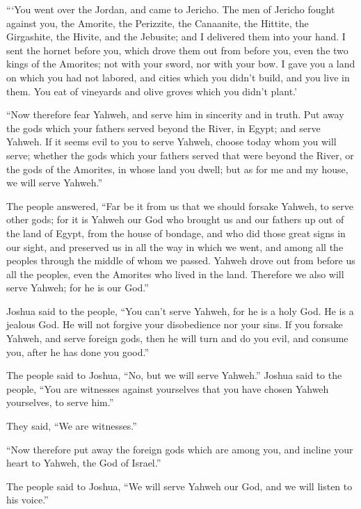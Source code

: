  ```You went over the Jordan, and came to Jericho. The men
of Jericho fought against you, the Amorite, the Perizzite, the
Canaanite, the Hittite, the Girgashite, the Hivite, and the Jebusite;
and I delivered them into your hand.  I sent the hornet
before you, which drove them out from before you, even the two kings of
the Amorites; not with your sword, nor with your bow.  I
gave you a land on which you had not labored, and cities which you
didn't build, and you live in them. You eat of vineyards and olive
groves which you didn't plant.'

 ``Now therefore fear Yahweh, and serve him in sincerity
and in truth. Put away the gods which your fathers served beyond the
River, in Egypt; and serve Yahweh.  If it seems evil to you
to serve Yahweh, choose today whom you will serve; whether the gods
which your fathers served that were beyond the River, or the gods of the
Amorites, in whose land you dwell; but as for me and my house, we will
serve Yahweh.''

 The people answered, ``Far be it from us that we should
forsake Yahweh, to serve other gods;  for it is Yahweh our
God who brought us and our fathers up out of the land of Egypt, from the
house of bondage, and who did those great signs in our sight, and
preserved us in all the way in which we went, and among all the peoples
through the middle of whom we passed.  Yahweh drove out
from before us all the peoples, even the Amorites who lived in the land.
Therefore we also will serve Yahweh; for he is our God.''

 Joshua said to the people, ``You can't serve Yahweh, for
he is a holy God. He is a jealous God. He will not forgive your
disobedience nor your sins.  If you forsake Yahweh, and
serve foreign gods, then he will turn and do you evil, and consume you,
after he has done you good.''

 The people said to Joshua, ``No, but we will serve
Yahweh.''  Joshua said to the people, ``You are witnesses
against yourselves that you have chosen Yahweh yourselves, to serve
him.''

They said, ``We are witnesses.''

 ``Now therefore put away the foreign gods which are among
you, and incline your heart to Yahweh, the God of Israel.''

 The people said to Joshua, ``We will serve Yahweh our God,
and we will listen to his voice.''

